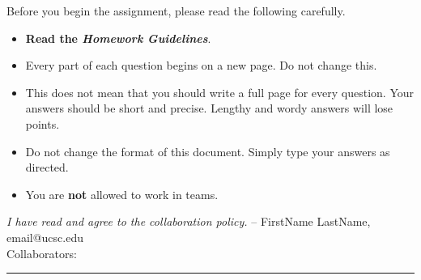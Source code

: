 \documentclass[11pt]{article}
\theoremstyle{definition}
\begin{document}
\noindent
Before you begin the assignment, please read the following carefully.
\begin{itemize}
    \item\textbf{ Read the \emph{Homework Guidelines}}.
    \item Every part of each question begins on a new page. Do not change this.
    \item This does not mean that you should write a full page for every question. Your answers should be short and precise. Lengthy and wordy answers will lose points.
    \item Do not change the format of this document. Simply type your answers as directed.
    \item You are \textbf{not} allowed to work in teams.
\end{itemize}
\emph{I have read and agree to the collaboration policy.}  -- FirstName LastName, email@ucsc.edu
\\
Collaborators: %
\\
\hrule
\end{document}
